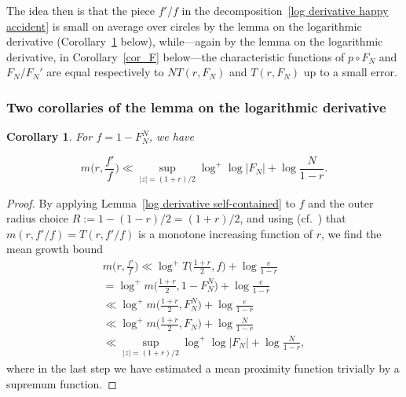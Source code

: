 \documentclass[10pt]{amsart}
\newtheorem{cor}[subsubsection]{Corollary}
\theoremstyle{remark}
\numberwithin{equation}{subsection}
\def\numequation{\addtocounter{subsubsection}{1}\begin{equation}}
\begin{document}
The idea then is that the piece $f'/f$ in the decomposition~\eqref{log derivative happy accident} is small on average over circles by the lemma on the logarithmic derivative (Corollary~\ref{cor_f} below), while---again by the lemma on the logarithmic derivative, in Corollary~\ref{cor_F} below---the characteristic
functions of $p \circ F_N$ and $F_N/F_N'$ are equal respectively to $N T(r,F_N)$ and $T(r,F_N)$ up to a small error. 

\subsubsection{Two corollaries of the lemma on the logarithmic derivative}
\begin{cor}\label{cor_f}
For $f= 1-F_N^N$, we have 
\numequation\label{log derivative is the key}
m\Big( r, \frac{f'}{f} \Big) \ll  \sup_{|z| = (1+r)/2} \log^+{\log{|F_N|}} + \log{\frac{N}{1-r} }.
\end{equation}
\end{cor}
\begin{proof}
By applying Lemma~\ref{log derivative self-contained} to $f$ and the outer radius choice
$R := 1 - (1-r)/2 = (1+r)/2$,
and using (cf.~\cite[Corollary 13.2.14]{BombieriGubler}) that $m(r,f'/f) = T(r,f'/f)$ is a monotone increasing function of $r$, we find the  mean growth bound
\begin{equation*}
\begin{split}
m\Big( r, \frac{f'}{f} \Big) \ll \log^+{T\Big(\frac{1+r}{2}, f\Big)} + \log{\frac{e}{1-r} } \\
=  \log^+{m\Big(\frac{1+r}{2}, 1 - F_N^N \Big)} + \log{\frac{e}{1-r} } \\
\ll \log^+{m\Big(\frac{1+r}{2}, F_N^N \Big)} +  \log{\frac{e}{1-r} } \\
\ll   \log^+{m\Big(\frac{1+r}{2}, F_N\Big)} + \log{\frac{N}{1-r} }  \\
\ll  \sup_{|z| = (1+r)/2} \log^+{\log{|F_N|}} + \log{\frac{N}{1-r} },
\end{split}
\end{equation*}
where in the last step we have estimated a mean proximity function trivially 
by a supremum function. 
\end{proof}
\end{document}
